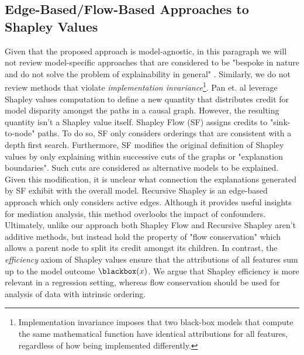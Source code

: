 \documentclass{article}
\theoremstyle{plain}
\theoremstyle{definition}
\theoremstyle{remark}
\theoremstyle{mystyle}
\begin{document}
\subsection{Edge-Based/Flow-Based Approaches to Shapley Values} 
\label{subsec:further_graph_based}
Given that the proposed approach is model-agnostic, in this paragraph we will not review model-specific approaches that are considered to be "bespoke in nature and do not solve the problem of explainability in general" . Similarly, we do not review methods that violate \textit{implementation invariance}\footnote{Implementation invariance imposes that two black-box models that compute the same mathematical function have identical attributions for all features, regardless of how being implemented differently.}. Pan et. al  leverage Shapley values computation to define a new quantity that distributes credit for model disparity amongst the paths in a causal graph. However, the resulting quantity isn't a Shapley value itself. Shapley Flow (SF) assigns credits to "sink-to-node" paths. To do so, SF only considers orderings that are consistent with a depth first search. Furthermore, SF modifies the original definition of Shapley values by only explaining within successive cuts of the graphs or "explanation boundaries". Such cuts are considered as alternative models to be explained. Given this modification, it is unclear what connection the explanations generated by SF exhibit with the overall model. Recursive Shapley  is an edge-based approach which only considers active edges. Although it provides useful insights for mediation analysis, this method overlooks the impact of confounders. Ultimately, unlike our approach both Shapley Flow and Recursive Shapley aren't additive methods, but instead hold the property of "flow conservation" which allows a parent node to split its credit amongst its children. In contrast, the \textit{efficiency} axiom of Shapley values ensure that the attributions of all features sum up to the model outcome $\blackbox(x)$. We argue that Shapley efficiency is more relevant in a regression setting, whereas flow conservation should be used for analysis of data with intrinsic ordering. 
\end{document}
